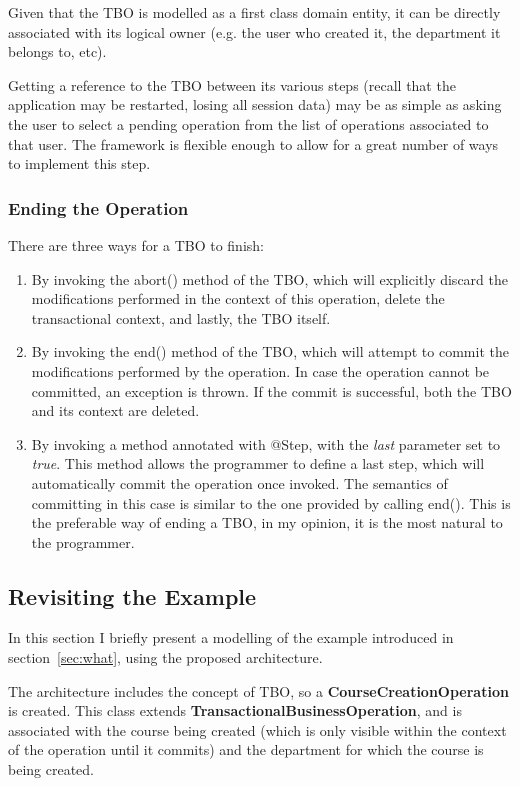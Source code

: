 \documentclass{llncs}
\begin{document}
Given that the TBO is modelled as a first class domain entity, it can
be directly associated with its logical owner (e.g. the user who
created it, the department it belongs to, etc).

Getting a reference to the TBO between its various steps (recall that
the application may be restarted, losing all session data) may be as
simple as asking the user to select a pending operation from the list
of operations associated to that user. The framework is flexible
enough to allow for a great number of ways to implement this step.

\subsubsection{Ending the Operation}

There are three ways for a TBO to finish:
\begin{enumerate}
\item By invoking the abort() method of the TBO, which will explicitly
  discard the modifications performed in the context of this
  operation, delete the transactional context, and lastly, the TBO
  itself.

\item By invoking the end() method of the TBO, which will attempt to
  commit the modifications performed by the operation. In case the
  operation cannot be committed, an exception is thrown. If the commit
  is successful, both the TBO and its context are deleted.

\item By invoking a method annotated with @Step, with the {\it last}
  parameter set to {\it true}. This method allows the programmer to
  define a last step, which will automatically commit the operation
  once invoked. The semantics of committing in this case is similar to
  the one provided by calling end(). This is the preferable way of
  ending a TBO, in my opinion, it is the most natural to the
  programmer.
\end{enumerate}

\subsection{Revisiting the Example}

In this section I briefly present a modelling of the example
introduced in section~\ref{sec:what}, using the proposed architecture.

The architecture includes the concept of TBO, so a {\bf
  CourseCreationOperation} is created. This class extends {\bf
  TransactionalBusinessOperation}, and is associated with the course
being created (which is only visible within the context of the
operation until it commits) and the department for which the course is
being created.
\end{document}
